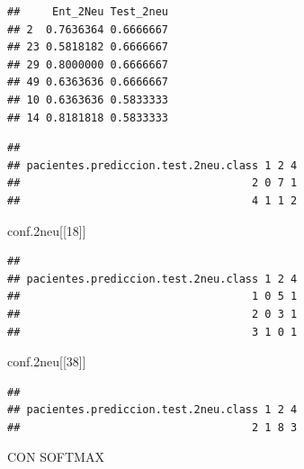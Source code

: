 \documentclass[]{article}
\newenvironment{Shaded}{\begin{snugshade}}{\end{snugshade}}
\newcommand{\CommentTok}[1]{\textcolor[rgb]{0.56,0.35,0.01}{\textit{#1}}}
\newcommand{\DecValTok}[1]{\textcolor[rgb]{0.00,0.00,0.81}{#1}}
\newcommand{\FloatTok}[1]{\textcolor[rgb]{0.00,0.00,0.81}{#1}}
\newcommand{\NormalTok}[1]{#1}
\begin{document}
\begin{verbatim}
##     Ent_2Neu Test_2neu
## 2  0.7636364 0.6666667
## 23 0.5818182 0.6666667
## 29 0.8000000 0.6666667
## 49 0.6363636 0.6666667
## 10 0.6363636 0.5833333
## 14 0.8181818 0.5833333
\end{verbatim}

\begin{Shaded}
\end{Shaded}

\begin{verbatim}
##                                     
## pacientes.prediccion.test.2neu.class 1 2 4
##                                    2 0 7 1
##                                    4 1 1 2
\end{verbatim}

\begin{Shaded}
\begin{Highlighting}[]
\NormalTok{conf}\FloatTok{.2}\NormalTok{neu[[}\DecValTok{18}\NormalTok{]]}
\end{Highlighting}
\end{Shaded}

\begin{verbatim}
##                                     
## pacientes.prediccion.test.2neu.class 1 2 4
##                                    1 0 5 1
##                                    2 0 3 1
##                                    3 1 0 1
\end{verbatim}

\begin{Shaded}
\begin{Highlighting}[]
\NormalTok{conf}\FloatTok{.2}\NormalTok{neu[[}\DecValTok{38}\NormalTok{]]}
\end{Highlighting}
\end{Shaded}

\begin{verbatim}
##                                     
## pacientes.prediccion.test.2neu.class 1 2 4
##                                    2 1 8 3
\end{verbatim}

CON SOFTMAX
\end{document}
